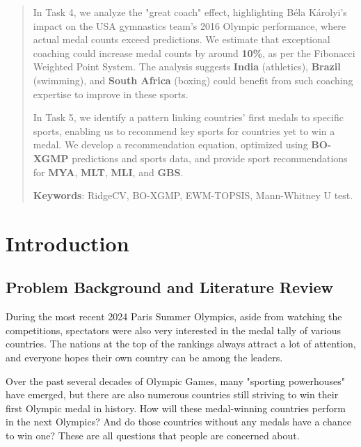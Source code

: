 \documentclass[12pt]{article}  %
\begin{document}
\begin{abstract}
In Task 4, we analyze the "great coach" effect, highlighting Béla Károlyi’s impact on the USA gymnastics team\textbf{}’s 2016 Olympic performance, where actual medal counts exceed predictions. We estimate that exceptional coaching could increase medal counts by around \textbf{10\%}, as per the Fibonacci Weighted Point System. The analysis suggests \textbf{India} (athletics), \textbf{Brazil} (swimming), and \textbf{South Africa} (boxing) could benefit from such coaching expertise to improve in these sports. 

In Task 5, we identify a pattern linking countries' first medals to specific sports, enabling us to recommend key sports for countries yet to win a medal. We develop a recommendation equation, optimized using \textbf{BO-XGMP} predictions and sports data, and provide sport recommendations for \textbf{MYA}, \textbf{MLT}, \textbf{MLI}, and \textbf{GBS}.



\vspace{5pt}
\textbf{Keywords}: RidgeCV, BO-XGMP, EWM-TOPSIS, Mann-Whitney U test.

\end{abstract}

\maketitle  %
\tableofcontents  %


\section{Introduction}
\subsection{Problem Background and Literature Review}
During the most recent 2024 Paris Summer Olympics, aside from watching the competitions, spectators were also very interested in the medal tally of various countries. The nations at the top of the rankings always attract a lot of attention, and everyone hopes their own country can be among the leaders.

Over the past several decades of Olympic Games, many "sporting powerhouses" have emerged, but there are also numerous countries still striving to win their first Olympic medal in history. How will these medal-winning countries perform in the next Olympics? And do those countries without any medals have a chance to win one? These are all questions that people are concerned about.
\end{document}
